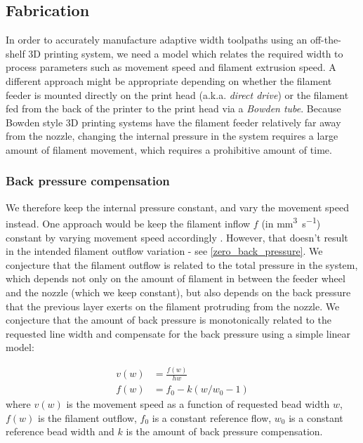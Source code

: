 \documentclass[5p,10pt,times]{elsarticle}
\theoremstyle{definition}
\numberwithin{question}{section}
\begin{document}
{{\subsection{Fabrication}
In order to accurately manufacture adaptive width toolpaths using an off-the-shelf 3D printing system,
we need a model which relates the required width to process parameters such as movement speed and filament extrusion speed.
A different approach might be appropriate depending on whether the filament feeder is mounted directly on the print head (a.k.a. \emph{direct drive}) or the filament fed from the back of the printer to the print head via a \emph{Bowden tube}.
Because Bowden style 3D printing systems have the filament feeder relatively far away from the nozzle, changing the internal pressure in the system requires a large amount of filament movement, which requires a prohibitive amount of time.

\subsubsection{Back pressure compensation}
We therefore keep the internal pressure constant, and vary the movement speed instead.
One approach would be keep the filament inflow $f$ (in \si{\milli\meter\cubed\per\second}) constant by varying movement speed accordingly \cite{Kuipers2018}.
However, that doesn't result in the intended filament outflow variation - see \cref{zero_back_pressure}.
We conjecture that the filament outflow is related to the total pressure in the system,
which depends not only on the amount of filament in between the feeder wheel and the nozzle (which we keep constant), 
but also depends on the back pressure that the previous layer exerts on the filament protruding from the nozzle.
We conjecture that the amount of back pressure is monotonically related to the requested line width and compensate for the back pressure using a simple linear model:

\begin{align}
 v(w) &= \frac{f(w)}{h w} \\ 
 f(w) &= f_0 - k \left( w / w_0 - 1 \right)
\end{align}
where
$v(w)$ is the movement speed as a function of requested bead width $w$,
$f(w)$ is the filament outflow,
$f_0$ is a constant reference flow,
$w_0$ is a constant reference bead width
and
$k$ is the amount of back pressure compensation.

}}
\end{document}
